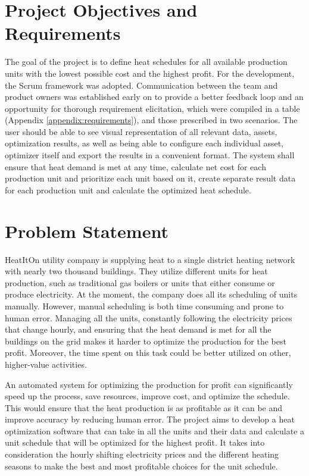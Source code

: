 
\section{Project Objectives and Requirements}

The goal of the project is to define heat schedules for all available production units with the lowest possible cost and the highest profit. For the development, the Scrum framework was adopted. Communication between the team and product owners was established early on to provide a better feedback loop and an opportunity for thorough requirement elicitation, which were compiled in a table (Appendix \ref{appendix:requirements}), and those prescribed in two scenarios. The user should be able to see visual representation of all relevant data, assets, optimization results, as well as being able to configure each individual asset, optimizer itself and export the results in a convenient format. The system shall ensure that heat demand is met at any time, calculate net cost for each production unit and prioritize each unit based on it, create separate result data for each production unit and calculate the optimized heat schedule. 

\section{Problem Statement}

HeatItOn utility company is supplying heat to a single district heating network with nearly two thousand buildings. They utilize different units for heat production, such as traditional gas boilers or units that either consume or produce electricity. At the moment, the company does all its scheduling of units manually. However, manual scheduling is both time consuming and prone to human error. Managing all the units, constantly following the electricity prices that change hourly, and ensuring that the heat demand is met for all the buildings on the grid makes it harder to optimize the production for the best profit. Moreover, the time spent on this task could be better utilized on other, higher-value activities.\par
An automated system for optimizing the production for profit can significantly speed up the process, save resources, improve cost, and optimize the schedule. This would ensure that the heat production is as profitable as it can be and improve accuracy by reducing human error. The project aims to develop a heat optimization software that can take in all the units and their data and calculate a unit schedule that will be optimized for the highest profit. It takes into consideration the hourly shifting electricity prices and the different heating seasons to make the best and most profitable choices for the unit schedule.


